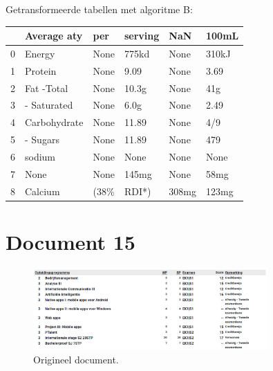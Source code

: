 Getransformeerde tabellen met algoritme B:

\begin{tabular}{llllll}
\toprule
{} &   Average aty &   per & serving &    NaN &  100mL \\
\midrule
0 &        Energy &  None &   775kd &   None &  310kJ \\
1 &       Protein &  None &    9.09 &   None &   3.69 \\
2 &    Fat -Total &  None &   10.3g &   None &    41g \\
3 &   - Saturated &  None &    6.0g &   None &   2.49 \\
4 &  Carbohydrate &  None &   11.89 &   None &    4/9 \\
5 &      - Sugars &  None &   11.89 &   None &    479 \\
6 &        sodium &  None &    None &   None &   None \\
7 &          None &  None &   145mg &   None &   58mg \\
8 &       Calcium &  (38\% &   RDI*) &  308mg &  123mg \\
\bottomrule
\end{tabular}
\section{Document 15}

\begin{figure}[H]
    \centering
    \includegraphics[width=0.8\textwidth]{test-resultaten/15/orignal.png}
    \caption{Origineel document.}
\end{figure}

